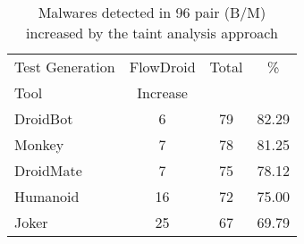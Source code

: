\begin{table}[ht]
\centering
\begin{tabular}{lccc}\toprule
 Test Generation & FlowDroid & Total & \%\\
 Tool & Increase  &  & \\ \midrule
 DroidBot & 6 & 79 & 82.29\\
 Monkey & 7 &  78 & 81.25 \\
 DroidMate & 7 & 75 & 78.12  \\
 Humanoid & 16 & 72 & 75.00 \\
 Joker & 25 & 67 & 69.79  \\\midrule
 
\end{tabular} 
\caption{Malwares detected in 96 pair (B/M) increased by the taint analysis approach}
\label{tab:taint}
\end{table}

